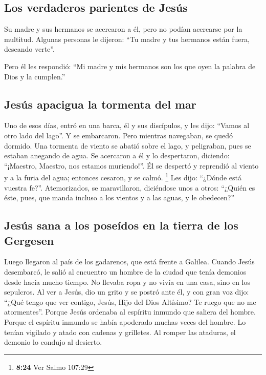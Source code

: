 \hypertarget{los-verdaderos-parientes-de-jesuxfas}{%
\subsection{Los verdaderos parientes de
Jesús}\label{los-verdaderos-parientes-de-jesuxfas}}

 Su madre y sus hermanos se acercaron a él, pero no
podían acercarse por la multitud.  Algunas personas le
dijeron: ``Tu madre y tus hermanos están fuera, deseando verte''.

 Pero él les respondió: ``Mi madre y mis hermanos son los
que oyen la palabra de Dios y la cumplen.''

\hypertarget{jesuxfas-apacigua-la-tormenta-del-mar}{%
\subsection{Jesús apacigua la tormenta del
mar}\label{jesuxfas-apacigua-la-tormenta-del-mar}}

 Uno de esos días, entró en una barca, él y sus
discípulos, y les dijo: ``Vamos al otro lado del lago''. Y se
embarcaron.  Pero mientras navegaban, se quedó dormido.
Una tormenta de viento se abatió sobre el lago, y peligraban, pues se
estaban anegando de agua.  Se acercaron a él y lo
despertaron, diciendo: ``¡Maestro, Maestro, nos estamos muriendo!''. Él
se despertó y reprendió al viento y a la furia del agua; entonces
cesaron, y se calmó. \footnote{\textbf{8:24} Ver Salmo 107:29}
 Les dijo: ``¿Dónde está vuestra fe?''. Atemorizados, se
maravillaron, diciéndose unos a otros: ``¿Quién es éste, pues, que manda
incluso a los vientos y a las aguas, y le obedecen?''

\hypertarget{jesuxfas-sana-a-los-poseuxeddos-en-la-tierra-de-los-gergesen}{%
\subsection{Jesús sana a los poseídos en la tierra de los
Gergesen}\label{jesuxfas-sana-a-los-poseuxeddos-en-la-tierra-de-los-gergesen}}

 Luego llegaron al país de los gadarenos, que está frente
a Galilea.  Cuando Jesús desembarcó, le salió al
encuentro un hombre de la ciudad que tenía demonios desde hacía mucho
tiempo. No llevaba ropa y no vivía en una casa, sino en los sepulcros.
 Al ver a Jesús, dio un grito y se postró ante él, y con
gran voz dijo: ``¿Qué tengo que ver contigo, Jesús, Hijo del Dios
Altísimo? Te ruego que no me atormentes''.  Porque Jesús
ordenaba al espíritu inmundo que saliera del hombre. Porque el espíritu
inmundo se había apoderado muchas veces del hombre. Lo tenían vigilado y
atado con cadenas y grilletes. Al romper las ataduras, el demonio lo
condujo al desierto.

